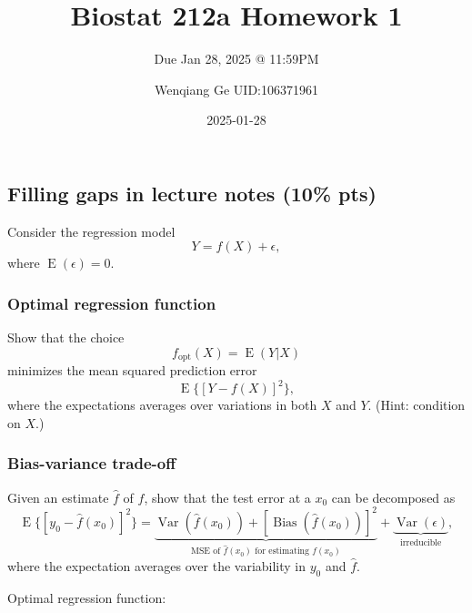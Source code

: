 \documentclass[
]{article}
\title{Biostat 212a Homework 1}
\subtitle{Due Jan 28, 2025 @ 11:59PM}
\author{Wenqiang Ge UID:106371961}
\date{2025-01-28}
\renewcommand*\contentsname{Table of contents}
\newcommand\contentsname{Table of contents}
\begin{document}
\maketitle
\ifdefined\Shaded\renewenvironment{Shaded}{\begin{tcolorbox}[sharp corners, frame hidden, enhanced, boxrule=0pt, breakable, interior hidden, borderline west={3pt}{0pt}{shadecolor}]}{\end{tcolorbox}}\fi

\renewcommand*\contentsname{Table of contents}
{
\hypersetup{linkcolor=}
\setcounter{tocdepth}{2}
\tableofcontents
}
\hypertarget{filling-gaps-in-lecture-notes-10-pts}{%
\subsection{Filling gaps in lecture notes (10\%
pts)}\label{filling-gaps-in-lecture-notes-10-pts}}

Consider the regression model \[
Y = f(X) + \epsilon,
\] where \(\operatorname{E}(\epsilon) = 0\).

\hypertarget{optimal-regression-function}{%
\subsubsection{Optimal regression
function}\label{optimal-regression-function}}

Show that the choice \[
f_{\text{opt}}(X) = \operatorname{E}(Y | X)
\] minimizes the mean squared prediction error \[
\operatorname{E}\{[Y - f(X)]^2\},
\] where the expectations averages over variations in both \(X\) and
\(Y\). (Hint: condition on \(X\).)

\hypertarget{bias-variance-trade-off}{%
\subsubsection{Bias-variance trade-off}\label{bias-variance-trade-off}}

Given an estimate \(\hat f\) of \(f\), show that the test error at a
\(x_0\) can be decomposed as \[
\operatorname{E}\{[y_0 - \hat f(x_0)]^2\} = \underbrace{\operatorname{Var}(\hat f(x_0)) + [\operatorname{Bias}(\hat f(x_0))]^2}_{\text{MSE of } \hat f(x_0) \text{ for estimating } f(x_0)} + \underbrace{\operatorname{Var}(\epsilon)}_{\text{irreducible}},
\] where the expectation averages over the variability in \(y_0\) and
\(\hat f\).

Optimal regression function:
\end{document}
